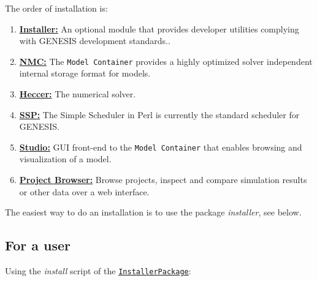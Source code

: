\documentclass[12pt]{article}
\begin{document}
The order of installation is:
\begin{enumerate}
\item \href{../installer-package/installer-package.tex}{\bf Installer:} An optional module that provides developer utilities complying with GENESIS development standards..
\item \href{../model-container/model-container.tex}{\bf NMC:} The {\tt Model Container} provides a highly optimized solver independent internal storage format for models.
\item \href{../heccer/heccer.tex}{\bf Heccer:} The numerical solver.
\item \href{../ssp/ssp.tex}{\bf SSP:} The Simple Scheduler in Perl is currently the standard scheduler for GENESIS.
\item \href{../studio/studio.tex}{\bf Studio:} GUI front-end to the {\tt Model Container} that enables browsing and visualization of a model.
\item \href{../project-browser/project-browser}{\bf Project Browser:} Browse projects, inspect and compare simulation results or other data over a web interface. 
\end{enumerate} 

The easiest way to do an installation is to use the package {\it installer}, see below.

\subsection*{For a user}

Using the {\it install} script of the \href{../installer-package/installer-package.tex}{\tt InstallerPackage}:
\end{document}
